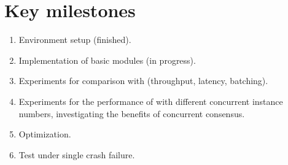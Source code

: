 
\section{Key milestones}
\begin{enumerate}
    \item Environment setup (finished).
    \item Implementation of basic modules \RCC{} (in progress).
    \item Experiments for comparison with \PBFT{} (throughput, latency, batching).
    \item Experiments for the performance of \RCC{} with different concurrent instance numbers, investigating the benefits of concurrent consensus.
    \item Optimization.
    \item Test under single crash failure.
\end{enumerate}